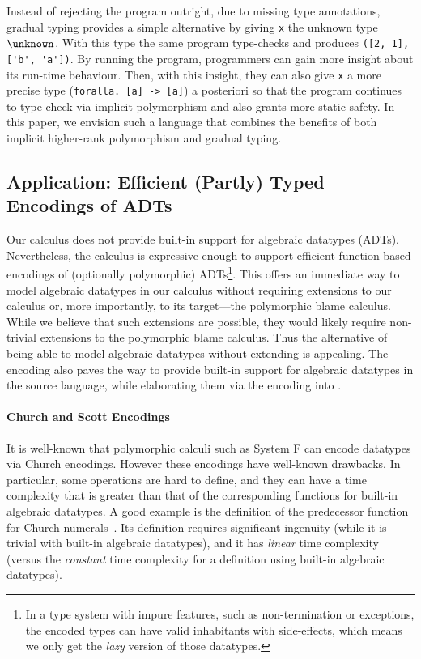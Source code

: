 Instead
of rejecting the program outright, due to missing type annotations, gradual
typing provides a simple alternative by giving \lstinline$x$ the unknown type
$\unknown$. With this type the same program type-checks and produces
\lstinline$([2, 1], ['b', 'a'])$. By running the program, programmers can gain
more insight about its run-time behaviour. Then, with this insight, they can
also give \lstinline$x$ a more precise type (\lstinline$foralla. [a] -> [a]$) a
posteriori so that the program continues to type-check via implicit polymorphism
and also grants more static safety. In this paper, we envision such a language
that combines the benefits of both implicit higher-rank polymorphism and gradual
typing.

\subsection{Application: Efficient (Partly) Typed Encodings of ADTs}

Our calculus does not provide built-in support for algebraic datatypes (ADTs).
Nevertheless, the calculus is expressive enough to support efficient
function-based encodings of (optionally polymorphic) ADTs\footnote{In a type
  system with impure features, such as non-termination or exceptions, the encoded
  types can have valid inhabitants with side-effects, which means we only get
  the \textit{lazy} version of those datatypes.}.
This offers an immediate way to model algebraic
datatypes in our calculus without requiring extensions to our calculus or, more
importantly, to its target---the polymorphic blame calculus. While we believe
that such extensions are possible, they would likely require non-trivial
extensions to the polymorphic blame calculus. Thus the alternative of being able
to model algebraic datatypes without extending \pbc is appealing. The encoding
also paves the way to provide built-in support for algebraic datatypes in the
source language, while elaborating them via the encoding into \pbc.

\paragraph{Church and Scott Encodings}
It is well-known
that polymorphic calculi such as System F can encode datatypes via
Church encodings. However these encodings have well-known drawbacks. 
In particular, some operations are hard to define, and they can have a time
complexity that is greater than that of the corresponding functions for built-in
algebraic datatypes. A good example is the definition of
the predecessor function for Church numerals~\citep{church1941calculi}. Its
definition requires significant ingenuity (while it is trivial with 
built-in algebraic datatypes), and it has \emph{linear} time
complexity (versus the \emph{constant} time complexity for a definition 
using built-in algebraic datatypes). 

